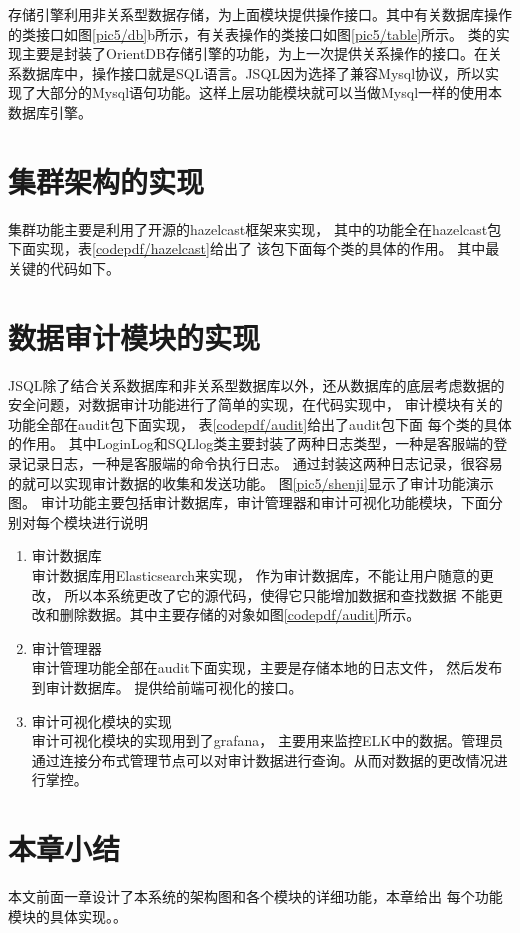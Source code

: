 存储引擎利用非关系型数据存储，为上面模块提供操作接口。其中有关数据库操作的类接口如图\ref{pic5/db}b所示，有关表操作的类接口如图\ref{pic5/table}所示。
类的实现主要是封装了OrientDB存储引擎的功能，为上一次提供关系操作的接口。在关系数据库中，操作接口就是SQL语言。JSQL因为选择了兼容Mysql协议，所以实现了大部分的Mysql语句功能。这样上层功能模块就可以当做Mysql一样的使用本数据库引擎。
\section{集群架构的实现}
集群功能主要是利用了开源的hazelcast框架来实现，
其中的功能全在hazelcast包下面实现，表\ref{codepdf/hazelcast}给出了
该包下面每个类的具体的作用。
其中最关键的代码如下。



\section{数据审计模块的实现}
JSQL除了结合关系数据库和非关系型数据库以外，还从数据库的底层考虑数据的安全问题，对数据审计功能进行了简单的实现，在代码实现中，
审计模块有关的功能全部在audit包下面实现，
表\ref{codepdf/audit}给出了audit包下面
每个类的具体的作用。
其中LoginLog和SQLlog类主要封装了两种日志类型，一种是客服端的登录记录日志，一种是客服端的命令执行日志。
通过封装这两种日志记录，很容易的就可以实现审计数据的收集和发送功能。
图\ref{pic5/shenji}显示了审计功能演示图。
审计功能主要包括审计数据库，审计管理器和审计可视化功能模块，下面分别对每个模块进行说明
\begin{enumerate}
	\item 审计数据库\\
	审计数据库用Elasticsearch来实现，
	作为审计数据库，不能让用户随意的更改，
	所以本系统更改了它的源代码，使得它只能增加数据和查找数据
	不能更改和删除数据。其中主要存储的对象如图\ref{codepdf/audit}所示。
	\item 审计管理器\\
	审计管理功能全部在audit下面实现，主要是存储本地的日志文件，
	然后发布到审计数据库。
	提供给前端可视化的接口。
	\item 审计可视化模块的实现\\
	审计可视化模块的实现用到了grafana，
	主要用来监控ELK中的数据。管理员通过连接分布式管理节点可以对审计数据进行查询。从而对数据的更改情况进行掌控。
\end{enumerate}
\section{本章小结}
本文前面一章设计了本系统的架构图和各个模块的详细功能，本章给出
每个功能模块的具体实现。。